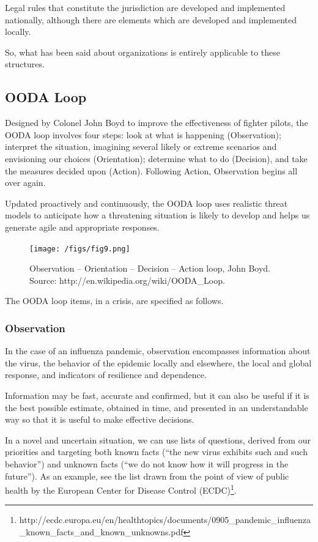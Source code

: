 \documentclass[12pt, a4]{scrartcl}
\begin{document}
Legal rules that constitute the jurisdiction are developed and implemented nationally, although there are elements which are developed and implemented locally.

So, what has been said about organizations is entirely applicable to these structures.

\subsection{OODA Loop}

Designed by Colonel John Boyd to improve the effectiveness of fighter pilots, the OODA loop involves four steps: look at what is happening (Observation); interpret the situation, imagining several likely or extreme scenarios and envisioning our choices (Orientation); determine what to do (Decision), and take the measures decided upon (Action). Following Action, Observation begins all over again. 

Updated proactively and continuously, the OODA loop uses realistic threat models to anticipate how a threatening situation is likely to develop and helps us generate agile and appropriate responses.

\begin{figure}[h]
\centering
\texttt{[image: /figs/fig9.png]}
\caption{Observation – Orientation – Decision – Action loop, John Boyd. Source: http://en.wikipedia.org/wiki/OODA_Loop.}
\end{figure}

The OODA loop items, in a crisis, are specified as follows.

\subsubsection{Observation}
In the case of an influenza pandemic, observation encompasses information about the virus, the behavior of the epidemic locally and elsewhere, the local and global response, and indicators of resilience and dependence.

Information may be fast, accurate and confirmed, but it can also be useful if it is the best possible estimate, obtained in time, and presented in an understandable way so that it is useful to make effective decisions.

In a novel and uncertain situation, we can use lists of questions, derived from our priorities and targeting both known facts (“the new virus exhibits such and such behavior”) and unknown facts (“we do not know how it will progress in the future”). As an example, see the list drawn from the point of view of public health by the European Center for Disease Control (ECDC)\footnote{http://ecdc.europa.eu/en/healthtopics/documents/0905_pandemic_influenza_known_facts_and_known_unknowns.pdf}.
\end{document}
